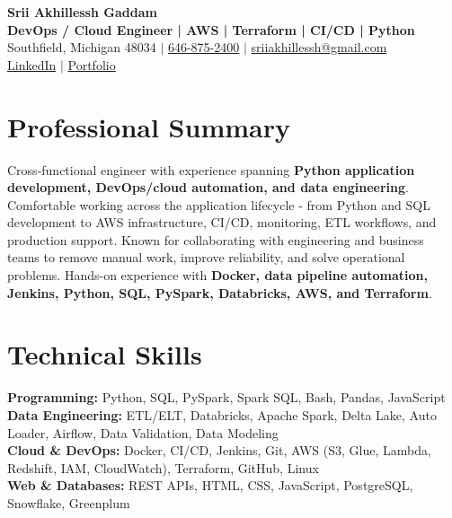 \documentclass[letterpaper,10pt]{article}
\begin{document}
\fontsize{9.35pt}{10.45pt}\selectfont

\begin{center}
    {\LARGE \textbf{Srii Akhillessh Gaddam}} \\[-1pt]
    \textbf{DevOps / Cloud Engineer | AWS | Terraform | CI/CD | Python} \\[2pt]
    Southfield, Michigan 48034 $|$
    \href{tel:6468752400}{646-875-2400} $|$
    \href{mailto:sriiakhillessh@gmail.com}{sriiakhillessh@gmail.com} \\[1pt]
    \href{https://www.linkedin.com/in/srii-akhiilessh-gaddam-b48668191/}{LinkedIn} $|$
    \href{https://sriiakhillesshg.github.io/portfolio/}{Portfolio}
\end{center}
\vspace{-8pt}

\section{Professional Summary}
\small{Cross-functional engineer with experience spanning \textbf{Python application development, DevOps/cloud automation, and data engineering}. Comfortable working across the application lifecycle - from Python and SQL development to AWS infrastructure, CI/CD, monitoring, ETL workflows, and production support. Known for collaborating with engineering and business teams to remove manual work, improve reliability, and solve operational problems. Hands-on experience with \textbf{Docker, data pipeline automation, Jenkins, Python, SQL, PySpark, Databricks, AWS, and Terraform}.}

\section{Technical Skills}
\small{
\textbf{Programming:} Python, SQL, PySpark, Spark SQL, Bash, Pandas, JavaScript \\
\textbf{Data Engineering:} ETL/ELT, Databricks, Apache Spark, Delta Lake, Auto Loader, Airflow, Data Validation, Data Modeling \\
\textbf{Cloud \& DevOps:} Docker, CI/CD, Jenkins, Git, AWS (S3, Glue, Lambda, Redshift, IAM, CloudWatch), Terraform, GitHub, Linux \\
\textbf{Web \& Databases:} REST APIs, HTML, CSS, JavaScript, PostgreSQL, Snowflake, Greenplum
}
\end{document}
